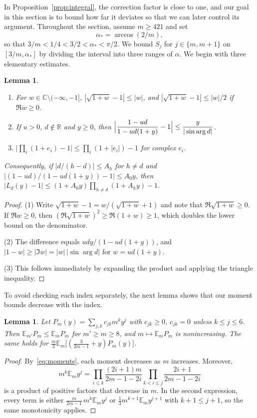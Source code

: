 \documentclass[11pt]{amsart}
\newtheorem{lemma}[theorem]{Lemma}
\theoremstyle{remark}
\newcommand{\E}{\mathbb{E}}
\begin{document}
In Proposition~\ref{prop:integral}, the correction factor is close to one,
and our goal in this section is to bound how far it deviates so that we can
later control its argument. Throughout the section, assume $m\ge421$ and set
\[
 \alpha_*=\arccos(2/m),
\]
so that $3/m<1/4<3/2<\alpha_*<\pi/2$. We bound $S_j$ for $j\in\{m,m+1\}$ on
$[3/m,\alpha_*]$ by dividing the interval into three ranges of $\alpha$. We
begin with three elementary estimates.

\begin{lemma}\label{lem:elem}
\begin{enumerate}
\item For $w\in\mathbb C\setminus(-\infty,-1]$, $|\sqrt{1+w}-1|\le|w|$, and
$|\sqrt{1+w}-1|\le|w|/2$ if $\Re w\ge0$.
\item If $u>0$, $d\notin\mathbb R$ and $y\ge0$, then
$\Bigl|\dfrac{1-ud}{1-ud(1+y)}-1\Bigr|\le\dfrac{y}{|\sin\arg d|}$.
\item $\bigl|\prod_i(1+e_i)-1\bigr|\le\prod_i(1+|e_i|)-1$ for complex $e_i$.
\end{enumerate}
Consequently, if $|d/(h-d)|\le A_h$ for $h\ne d$ and
$|(1-ud)/(1-ud(1+y))-1|\le A_0y$, then
$|L_d(y)-1|\le(1+A_0y)\prod_{h\ne d}(1+A_hy)-1$.
\end{lemma}

\begin{proof}
(1) Write $\sqrt{1+w}-1=w/(\sqrt{1+w}+1)$ and note that
$\Re\sqrt{1+w}\ge0$. If $\Re w\ge0$, then $(\Re\sqrt{1+w})^2\ge\Re(1+w)\ge1$,
which doubles the lower bound on the denominator.

(2) The difference equals $udy/(1-ud(1+y))$, and
$|1-w|\ge|\Im w|=|w|\,|\sin\arg d|$ for $w=ud(1+y)$.

(3) This follows immediately by expanding the product and applying the
triangle inequality.
\end{proof}

To avoid checking each index separately, the next lemma shows that our
moment bounds decrease with the index.

\begin{lemma}\label{lem:moments}
Let $P_m(y)=\sum_{j,k}c_{jk}m^ky^j$ with $c_{jk}\ge0$, $c_{jk}=0$ unless
$k\le j\le6$. Then $\E_{m'}P_m\le\E_mP_m$ for $m'\ge m\ge8$, and
$m\mapsto\E_mP_m$ is nonincreasing. The same holds for
$\frac m3\E_m\bigl[(\frac3{2m-1}+y)P_m(y)\bigr]$.
\end{lemma}

\begin{proof}
By~\eqref{eq:moments}, each moment decreases as $m$ increases. Moreover,
\[
m^k\E_my^j=\prod_{i\le k}\frac{(2i+1)m}{2m-1-2i}\prod_{k<i\le j}\frac{2i+1}{2m-1-2i}
\]
is a product of positive factors that decrease in $m$. In the second
expression, every term is either $\frac{m}{2m-1}\,m^k\E_my^j$ or
$\frac13m^{k+1}\E_my^{j+1}$ with $k+1\le j+1$, so the same monotonicity
applies.
\end{proof}
\end{document}
